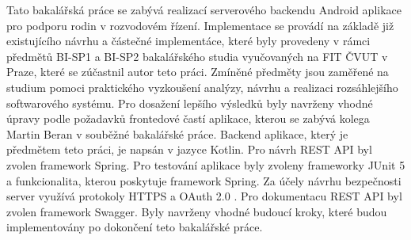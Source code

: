 Tato bakalářská práce se zabývá realizací serverového backendu Android aplikace pro podporu rodin v rozvodovém řízení. Implementace se provádí na základě již existujícího návrhu a částečné implementáce, které byly provedeny v rámci předmětů BI-SP1 a BI-SP2 bakalářského studia vyučovaných na FIT ČVUT v Praze, které se zúčastnil autor teto práci. Zmíněné předměty jsou zaměřené na studium pomoci praktického vyzkoušení analýzy, návrhu a realizaci rozsáhlejšího softwarového systému. Pro dosažení lepšího výsledků byly navrženy vhodné úpravy podle požadavků frontedové častí aplikace, kterou se zabývá kolega Martin Beran v souběžné bakalářské práce. Backend aplikace, který je předmětem teto práci, je napsán v jazyce Kotlin. Pro návrh REST API byl zvolen framework Spring. Pro testování aplikace byly zvoleny frameworky JUnit 5 a funkcionalita, kterou poskytuje framework Spring. Za účely návrhu bezpečnosti server využívá protokoly HTTPS a OAuth 2.0 . Pro dokumentacu REST API byl zvolen framework Swagger. Byly navrženy vhodné budoucí kroky, které budou implementovány po dokončení teto bakalářské práce.